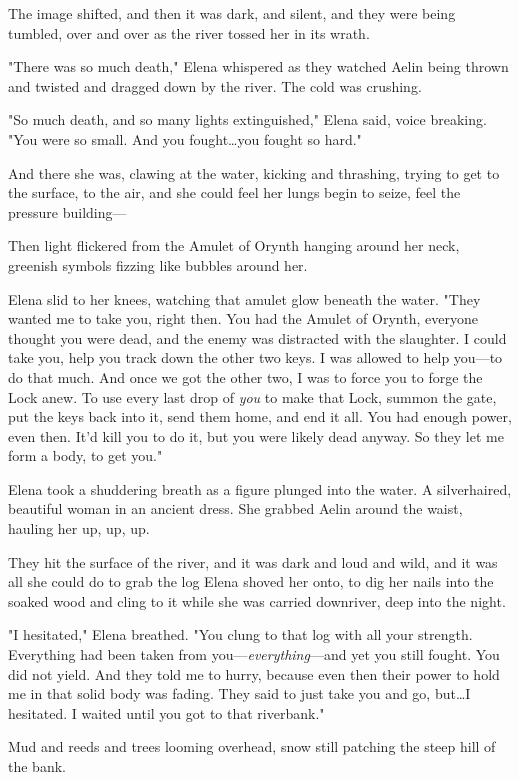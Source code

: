 The image shifted, and then it was dark, and silent, and they were being tumbled, over and over as the river tossed her in its wrath.

"There was so much death," Elena whispered as they watched Aelin being thrown and twisted and dragged down by the river.
The cold was crushing.

"So much death, and so many lights extinguished," Elena said, voice breaking.
"You were so small.
And you fought\ldots you fought so hard."

And there she was, clawing at the water, kicking and thrashing, trying to get to the surface, to the air, and she could feel her lungs begin to seize, feel the pressure building---

Then light flickered from the Amulet of Orynth hanging around her neck, greenish symbols fizzing like bubbles around her.

Elena slid to her knees, watching that amulet glow beneath the water.
"They wanted me to take you, right then.
You had the Amulet of Orynth, everyone thought you were dead, and the enemy was distracted with the slaughter.
I could take you, help you track down the other two keys.
I was allowed to help you---to do that much.
And once we got the other two, I was to force you to forge the Lock anew.
To use every last drop of \emph{you} to make that Lock, summon the gate, put the keys back into it, send them home, and end it all.
You had enough power, even then.
It'd kill you to do it, but you were likely dead anyway.
So they let me form a body, to get you."

Elena took a shuddering breath as a figure plunged into the water.
A silverhaired, beautiful woman in an ancient dress.
She grabbed Aelin around the waist, hauling her up, up, up.

They hit the surface of the river, and it was dark and loud and wild, and it was all she could do to grab the log Elena shoved her onto, to dig her nails into the soaked wood and cling to it while she was carried downriver, deep into the night.

"I hesitated," Elena breathed.
"You clung to that log with all your strength.
Everything had been taken from you---\emph{everything}---and yet you still fought.
You did not yield.
And they told me to hurry, because even then their power to hold me in that solid body was fading.
They said to just take you and go, but\ldots I hesitated.
I waited until you got to that riverbank."

Mud and reeds and trees looming overhead, snow still patching the steep hill of the bank.


